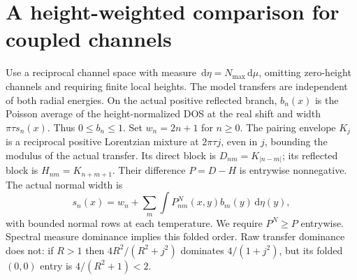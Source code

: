 \documentclass[11pt]{article}
\newcommand{\dd}{\,\mathrm{d}}
\begin{document}
\section{A height-weighted comparison for coupled channels}
Use a reciprocal channel space with measure $\dd\eta=N_{\max}\dd\mu$, omitting zero-height channels and requiring finite local heights. The model transfers are independent of both radial energies. On the actual positive reflected branch, $b_n(x)$ is the Poisson average of the height-normalized DOS at the real shift and width $\pi\tau s_n(x)$. Thus $0\le b_n\le1$. Set $w_n=2n+1$ for $n\ge0$. The pairing envelope $K_j$ is a reciprocal positive Lorentzian mixture at $2\pi\tau j$, even in $j$, bounding the modulus of the actual transfer. Its direct block is $D_{nm}=K_{|n-m|}$; its reflected block is $H_{nm}=K_{n+m+1}$. Their difference $P=D-H$ is entrywise nonnegative. The actual normal width is
\[
 s_n(x)=w_n+\sum_m\int P_{nm}^N(x,y)b_m(y)\dd\eta(y),
\]
with bounded normal rows at each temperature. We require $P^N\ge P$ entrywise. Spectral measure dominance implies this folded order. Raw transfer dominance does not: if $R>1$ then $4R^2/(R^2+j^2)$ dominates $4/(1+j^2)$, but its folded $(0,0)$ entry is $4/(R^2+1)<2$.
\end{document}
